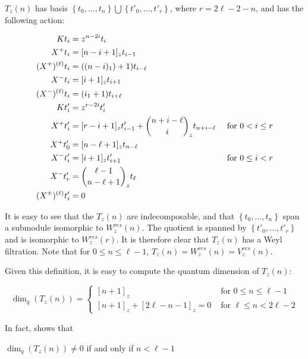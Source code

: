 $T_z(n)$ has basis $\left\{ t_0, \ldots, t_n \right\} \bigcup \left\{ t'_0,
    \ldots, t'_{r} \right\}$, where $r = 2\ell - 2 - n$, and has the following
    action:

\begin{align*}
    Kt_i &= z^{n-2i} t_i \\
    X^+ t_i &= [n-i+1]_z t_{i-1} \\
    (X^+)^{(\ell)} t_i &= ( (n-i)_1) + 1) t_{i-\ell} \\
    X^-t_i &= [i+1]_z t_{i+1} \\
    (X^-)^{(\ell)} t_i &= ( i_1 + 1) t_{i+\ell} \\
    Kt'_i &= z^{r-2i} t'_i \\
    X^+ t'_i &= [r-i+1]_z t'_{i-1}  + \dbinom{n + i - \ell}{i}_z t_{n+i-\ell} &\text{ for $0 < i \leq r$}\\
    X^+ t'_0 &= [n - \ell + 1]_z t_{n-\ell} \\
    X^-t'_i &= [i+1]_z t'_{i+1} &\text{ for $0 \leq i < r$}\\
    X^- t'_r &= \dbinom{\ell - 1}{n - \ell + 1}_z t_\ell \\
    (X^\pm)^{(\ell)} t'_i  &= 0
\end{align*}


It is easy to see that the $T_z(n)$ are indecomposable, and that $\left\{ t_0,
\ldots, t_n \right\}$ span a submodule isomorphic to $W_z^{res}(n)$. The
quotient is spanned by $\left\{ t'_0, \ldots, t'_r \right\}$ and is
isomorphic to $W_z^{res}(r)$. It is therefore clear that $T_z(n)$ has a Weyl
filtration. Note that for $0 \leq n \leq \ell -1$, $T_z(n) = W_z^{res}(n) = V_{z}^{res}(n)$.

Given this definition, it is easy to compute the quantum dimension of $T_z(n)$: 

\begin{equation}
    \dim_q(T_z(n)) = \begin{cases} [n+1]_z &\text{ for $0 \leq n \leq \ell-1$} \\
                                   [n+1]_z + [2\ell-n-1]_z = 0 &\text{ for $\ell \leq n < 2\ell - 2$}
                     \end{cases}
\end{equation}

In fact, \cite{Andersen1992} shows that 
\begin{prop}
$\dim_q(T_z(n)) \neq 0$ if and only if $n < \ell - 1$
\end{prop}

